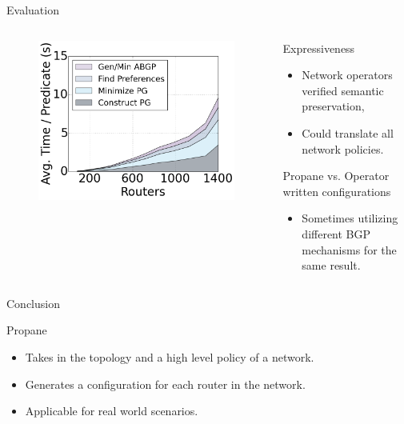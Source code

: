 \begin{frame}{Evaluation}
    \begin{columns}
        \begin{column}{0.45\textwidth}
            \begin{figure}
                \includegraphics[width=0.66\columnwidth,keepaspectratio]{figures/compilation-times-dc}
            \end{figure}
        \end{column}
        \begin{column}{0.50\textwidth}
            \begin{block}{Expressiveness}
                \begin{itemize}
                    \item Network operators verified semantic preservation,
                    \item Could translate all network policies.
                \end{itemize}
            \end{block}
            \begin{block}{Propane vs. Operator written configurations}
                \begin{itemize}
                    \item Sometimes utilizing different BGP mechanisms for the same result.
                \end{itemize}
            \end{block}
        \end{column}
    \end{columns}
\end{frame}

\begin{frame}{Conclusion}
    \begin{block}{Propane}
        \begin{itemize}
            \item Takes in the topology and a high level policy of a network.
            \item Generates a configuration for each router in the network.
            \item Applicable for real world scenarios.
        \end{itemize}
    \end{block}
\end{frame}
